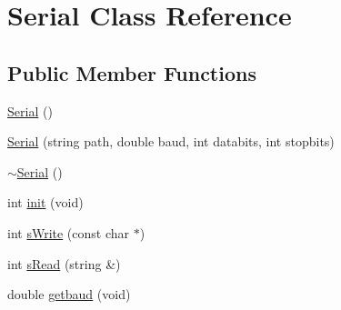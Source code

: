 \hypertarget{class_serial}{\section{Serial Class Reference}
\label{class_serial}
}
\subsection*{Public Member Functions}
\begin{DoxyCompactItemize}
\item 
\hyperlink{class_serial_a3667c3137f2df94716b5193f9fb736ab}{Serial} ()
\item 
\hyperlink{class_serial_ad1752229323debe90401633e7e814e4f}{Serial} (string path, double baud, int databits, int stopbits)
\item 
\hyperlink{class_serial_a5b32c394c0ff923a4ef1c13cfb20a6ba}{$\sim$\-Serial} ()
\item 
int \hyperlink{class_serial_af1957c23ed00561f3cab85113348918a}{init} (void)
\item 
int \hyperlink{class_serial_a6a0c8c007cf71091e99302898d1f1165}{s\-Write} (const char $\ast$)
\item 
int \hyperlink{class_serial_a6b9260c1cdd7f4353810c9f4489b5088}{s\-Read} (string \&)
\item 
double \hyperlink{class_serial_a8362c2dc601b4006eb2b7e1549d50415}{getbaud} (void)
\end{DoxyCompactItemize}


